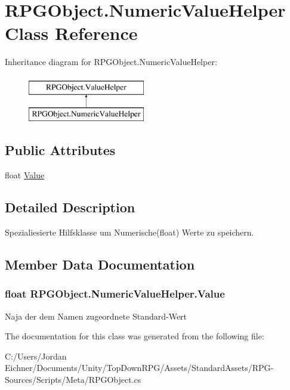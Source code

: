 \hypertarget{class_r_p_g_object_1_1_numeric_value_helper}{}\section{R\+P\+G\+Object.\+Numeric\+Value\+Helper Class Reference}
\label{class_r_p_g_object_1_1_numeric_value_helper}
Inheritance diagram for R\+P\+G\+Object.\+Numeric\+Value\+Helper\+:\begin{figure}[H]
\begin{center}
\leavevmode
\includegraphics[height=2.000000cm]{class_r_p_g_object_1_1_numeric_value_helper}
\end{center}
\end{figure}
\subsection*{Public Attributes}
\begin{DoxyCompactItemize}
\item 
float \hyperlink{class_r_p_g_object_1_1_numeric_value_helper_a848b98b34e4029244f2764a8b1724704}{Value}
\end{DoxyCompactItemize}


\subsection{Detailed Description}
Spezialiesierte Hilfsklasse um Numerische(float) Werte zu speichern. 

\subsection{Member Data Documentation}
\hypertarget{class_r_p_g_object_1_1_numeric_value_helper_a848b98b34e4029244f2764a8b1724704}{}
\subsubsection[{Value}]{\setlength{\rightskip}{0pt plus 5cm}float R\+P\+G\+Object.\+Numeric\+Value\+Helper.\+Value}\label{class_r_p_g_object_1_1_numeric_value_helper_a848b98b34e4029244f2764a8b1724704}
Naja der dem Namen zugeordnete Standard-\/\+Wert 

The documentation for this class was generated from the following file\+:\begin{DoxyCompactItemize}
\item 
C\+:/\+Users/\+Jordan Eichner/\+Documents/\+Unity/\+Top\+Down\+R\+P\+G/\+Assets/\+Standard\+Assets/\+R\+P\+G-\/\+Sources/\+Scripts/\+Meta/R\+P\+G\+Object.\+cs\end{DoxyCompactItemize}
